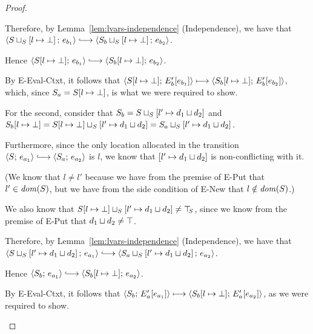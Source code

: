 \begin{proof}
\begin{enumerate}
\begin{enumerate}
      Therefore, by Lemma~\ref{lem:lvars-independence} (Independence),
      we have that
      $\config{\lubstore{S}{\store{\storebindingRaw{l}{\bot}}}}{e_{b_1}}
      \parstepsto
      \config{\lubstore{S_b}{\store{\storebindingRaw{l}{\bot}}}}{e_{b_2}}$.

      Hence $\config{\extSRaw{S}{l}{\bot}}{e_{b_1}} \parstepsto
      \config{\extSRaw{S_b}{l}{\bot}}{e_{b_2}}$.

      By {\sc E-Eval-Ctxt}, it follows that
      $\langle S[l \mapsto \bot];\, E'_b\hspace{-0.5mm}\left[e_{b_1}\right] \rangle
      \longmapsto
      \langle S_b[l \mapsto \bot];\, E'_b\hspace{-0.5mm}\left[e_{b_2}\right] \rangle$,
      which, since $S_a = S[l \mapsto \bot]$, is what we were
      required to show.

      For the second, consider that $S_b =
      S \sqcup_{S} \left[ l' \mapsto d_1 \sqcup d_2 \right]$
      and $S_b[l \mapsto \bot] =
      S[l \mapsto \bot] \sqcup_{S} \left[ l' \mapsto d_1 \sqcup d_2 \right]
      =
      S_a \sqcup_{S} \left[ l' \mapsto d_1 \sqcup d_2 \right]$.

      Furthermore, since the only location allocated in the transition
      $\config{S}{e_{a_1}} \parstepsto \config{S_a}{e_{a_2}}$ is $l$,
      we know that $\left[ l' \mapsto d_1 \sqcup d_2 \right]$
      is non-conflicting with it.

      (We know that $l \neq l'$ because we have from the premise of
      {\sc E-Put} that $l' \in \mathit{dom}(S)$, but we have from the side
      condition of {\sc E-New} that $l \notin \mathit{dom}(S)$.)

      We also know that
      $S[l \mapsto \bot] \sqcup_{S} \left[ l' \mapsto d_1 \sqcup d_2 \right]
      \neq \top\hspace{-0.85mm}_{S}$, since we know from the premise of {\sc E-Put} that
      $d_1 \sqcup d_2 \neq \top$.

      Therefore, by Lemma~\ref{lem:lvars-independence} (Independence),
      we have that
      $\config{\lubstore{S}{\store{\storebindingRaw{l'}{\userlub{d_1}{d_2}}}}}{e_{a_1}}
      \parstepsto
      \config{\lubstore{S_a}{\store{\storebindingRaw{l'}{\userlub{d_1}{d_2}}}}}{e_{a_2}}$.

      Hence $\config{S_b}{e_{a_1}} \parstepsto
      \config{\extSRaw{S_b}{l}{\bot}}{e_{a_2}}$.

      By {\sc E-Eval-Ctxt}, it follows that
      $\langle S_b;\, E'_a\hspace{-0.5mm}\left[e_{a_1}\right] \rangle \longmapsto
      \langle S_b[l \mapsto \bot];\, E'_a\hspace{-0.5mm}\left[e_{a_2}\right] \rangle$, as
      we were required to show.


\end{enumerate}
\end{enumerate}
\end{proof}
